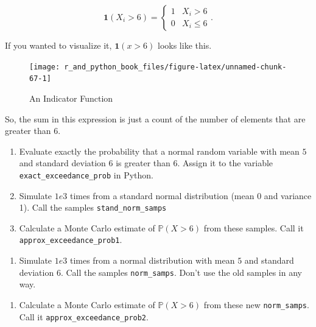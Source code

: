 \documentclass[
  12pt,
  krantz2]{krantz}
\providecommand{\tightlist}{%
  \setlength{\itemsep}{0pt}\setlength{\parskip}{0pt}}
\begin{document}
\begin{equation} 
\mathbf{1}(X_i > 6)
=
\begin{cases}
1 & X_i > 6 \\
0 & X_i \le 6
\end{cases}.
\end{equation}

If you wanted to visualize it, \(\mathbf{1}(x > 6)\) looks like this.

\begin{figure}

{\centering \texttt{[image: r\_and\_python\_book\_files/figure-latex/unnamed-chunk-67-1]} 

}

\caption{An Indicator Function}\label{fig:unnamed-chunk-67}
\end{figure}

So, the sum in this expression is just a count of the number of elements that are greater than \(6\).

\begin{enumerate}
\def\labelenumi{\alph{enumi}.}
\item
  Evaluate exactly the probability that a normal random variable with mean \(5\) and standard deviation \(6\) is greater than \(6\). Assign it to the variable \texttt{exact\_exceedance\_prob} in Python.
\item
  Simulate \(1e3\) times from a standard normal distribution (mean 0 and variance 1). Call the samples \texttt{stand\_norm\_samps}
\item
  Calculate a Monte Carlo estimate of \(\mathbb{P}(X > 6)\) from these samples. Call it \texttt{approx\_exceedance\_prob1}.
\end{enumerate}

\begin{enumerate}
\def\labelenumi{\arabic{enumi}.}
\setcounter{enumi}{3}
\tightlist
\item
  Simulate \(1e3\) times from a normal distribution with mean \(5\) and standard deviation \(6\). Call the samples \texttt{norm\_samps}. Don't use the old samples in any way.
\end{enumerate}

\begin{enumerate}
\def\labelenumi{\alph{enumi}.}
\setcounter{enumi}{3}
\tightlist
\item
  Calculate a Monte Carlo estimate of \(\mathbb{P}(X > 6)\) from these new \texttt{norm\_samps}. Call it \texttt{approx\_exceedance\_prob2}.
\end{enumerate}
\end{document}

